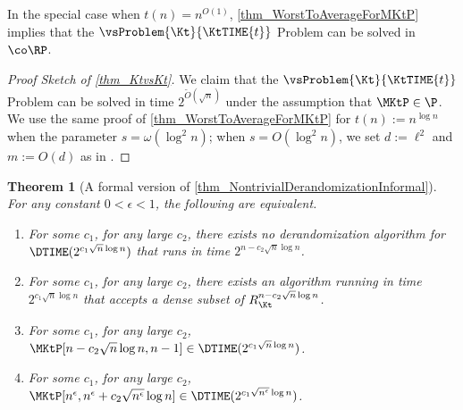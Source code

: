 \documentclass[11pt]{article}
\numberwithin{equation}{section}
\newtheorem{theorem}{Theorem}[section]
\theoremstyle{definition}
\theoremstyle{plain}
\begin{document}
In the special case when $t(n) = n^{O(1)}$, \cref{thm_WorstToAverageForMKtP} implies that the $\vsProblem{\Kt}{\KtTIME{t}}$ Problem can be solved
in $\co\RP$.
\begin{proof}
  [Proof Sketch of \cref{thm_KtvsKt}]
  We claim that the $\vsProblem{\Kt}{\KtTIME{t}}$ Problem can be solved in
  time $2^{\widetilde{O}(\sqrt{n})}$
  under the assumption that $\MKtP \in \P$.
  We use the same proof of \cref{thm_WorstToAverageForMKtP} for $t(n) := n^{\log n}$ when the parameter $s = \omega(\log^2 n)$;
  when $s = O(\log^2 n)$, we set $d := \ell^2$ and $m := O(d)$ as in \cite{Hirahara18_focs_conf}.
\end{proof}

\begin{theorem}
  [A formal version of \cref{thm_NontrivialDerandomizationInformal}]
  \label{thm_NontrivialDerandomizationFormal}
  For any constant $0 < \epsilon < 1$, the following are equivalent.
  \begin{enumerate}
    \item
          \label{item_NontrivialDerandomizationInTheorem}
          For some $c_1$, for any large $c_2$,
          there exists no derandomization algorithm for $\DTIME(2^{c_1 \sqrt{n} \log n})$ that runs in time $2^{n - c_2 \sqrt{n} \log n}$.
    \item
          \label{item_MKtPDenseSubset}
          For some $c_1$, for any large $c_2$,
          there exists an algorithm running in time $2^{c_1 \sqrt{n} \log n}$ that accepts a dense subset of $R_{\Kt}^{n - c_2 \sqrt{n} \log n}$.
    \item
          \label{item_MKtPLowerBoundInTheorem}
          For some $c_1$, for any large $c_2$,
          $\MKtP[n - c_2 \sqrt{n} \log n, n-1] \in \DTIME(2^{c_1 \sqrt{n} \log n})$.
    \item
          \label{item_MKtPLowerBoundSmallInTheorem}
          For some $c_1$, for any large $c_2$,
          $\MKtP[n^\epsilon, n^\epsilon + c_2 \sqrt{n^\epsilon} \log n] \in \DTIME(2^{c_1 \sqrt{n^\epsilon} \log n})$.
  \end{enumerate}
\end{theorem}
\end{document}
